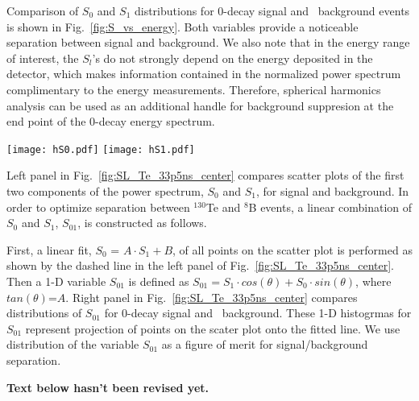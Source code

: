 Comparison of $S_0$ and $S_1$ distributions for 0\nbb-decay signal and \B~background events is shown in Fig.~\ref{fig:S_vs_energy}.
Both variables provide a noticeable separation between signal and background. We also note that in the energy range of interest, 
the $S_l$'s do not strongly depend on the energy deposited in the detector, which makes information contained in the normalized power 
spectrum complimentary to the energy measurements. Therefore, spherical harmonics analysis can be used as an additional handle for
background suppresion at the end point of the 0\nbb-decay energy spectrum.

\begin{figure*}[h]
\centering
\texttt{[image: hS0.pdf]}
\texttt{[image: hS1.pdf]}
\caption{$S_0$ (\emph{left}) and $S_1$ (\emph{right}) distributions for 1000 simulated 0\nbb-decay signal and \B~background events.
  Two different isotopes are compared, $^{130}$Te and $^{82}$Se. Corresponding kinetic energies of single electrons from \B~events are
  2.53 MeV and 3.00 MeV. Central events assuming perfect reconstruction of vertex position. Time cut of 33.5~ns on the PE arrival time is
  applied. The default QE and 100\% photo-coverage is used in the simulation. $^{8}$B events are implemented as monochromatic electrons
  with the initial direction along $x$-axis.}
\label{fig:S_vs_energy}
\end{figure*}

Left panel in Fig.~\ref{fig:SL_Te_33p5ns_center} compares scatter plots of the first two components of the power spectrum, 
$S_0$ and $S_1$, for signal and background. In order to optimize separation between $^{130}$Te and $^{8}$B
events, a linear combination of $S_0$ and $S_1$, $S_{01}$, is constructed as follows. 

First, a linear fit, $S_0$ = $A \cdot S_1 + B$, of all points on the scatter plot is performed as shown by the dashed 
line in the left panel of Fig.~\ref{fig:SL_Te_33p5ns_center}. Then a 1-D variable $S_{01}$ is defined as
$S_{01} = S_1 \cdot cos(\theta) + S_0 \cdot sin(\theta)$, where $tan(\theta)$=$A$. Right panel in Fig.~\ref{fig:SL_Te_33p5ns_center}
compares distributions of $S_{01}$ for 0\nbb-decay signal and \B~background. These 1-D histogrmas for $S_{01}$ represent
projection of points on the scater plot onto the fitted line. We use distribution of the variable $S_{01}$ as a figure of merit
for signal/background separation.

\textbf{Text below hasn't been revised yet.}


